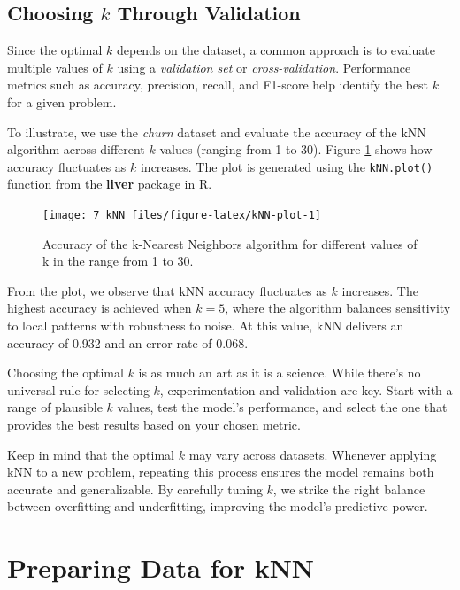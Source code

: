 \documentclass[
  11pt,
]{book}
\newcommand{\passthrough}[1]{#1}
\theoremstyle{definition}
\theoremstyle{definition}
\theoremstyle{definition}
\theoremstyle{definition}
\theoremstyle{remark}
\begin{document}
\subsection*{\texorpdfstring{Choosing \(k\) Through Validation}{Choosing k Through Validation}}\label{choosing-k-through-validation}


Since the optimal \(k\) depends on the dataset, a common approach is to evaluate multiple values of \(k\) using a \emph{validation set} or \emph{cross-validation}. Performance metrics such as accuracy, precision, recall, and F1-score help identify the best \(k\) for a given problem.

To illustrate, we use the \emph{churn} dataset and evaluate the accuracy of the kNN algorithm across different \(k\) values (ranging from 1 to 30). Figure \ref{fig:kNN-plot} shows how accuracy fluctuates as \(k\) increases. The plot is generated using the \passthrough{\lstinline!kNN.plot()!} function from the \textbf{liver} package in R.

\begin{figure}[H]

{\centering \texttt{[image: 7\_kNN\_files/figure-latex/kNN-plot-1]} 

}

\caption{Accuracy of the k-Nearest Neighbors algorithm for different values of k in the range from 1 to 30.}\label{fig:kNN-plot}
\end{figure}

From the plot, we observe that kNN accuracy fluctuates as \(k\) increases. The highest accuracy is achieved when \(k = 5\), where the algorithm balances sensitivity to local patterns with robustness to noise. At this value, kNN delivers an accuracy of 0.932 and an error rate of 0.068.

Choosing the optimal \(k\) is as much an art as it is a science. While there's no universal rule for selecting \(k\), experimentation and validation are key. Start with a range of plausible \(k\) values, test the model's performance, and select the one that provides the best results based on your chosen metric.

Keep in mind that the optimal \(k\) may vary across datasets. Whenever applying kNN to a new problem, repeating this process ensures the model remains both accurate and generalizable. By carefully tuning \(k\), we strike the right balance between overfitting and underfitting, improving the model's predictive power.

\section{Preparing Data for kNN}\label{preparing-data-for-knn}
\end{document}
